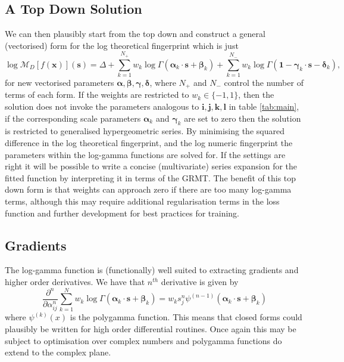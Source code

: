 \documentclass{article}
\begin{document}
\subsection{A Top Down Solution}
We can then plausibly start from the top down and construct a general (vectorised) form for the log theoretical fingerprint which is just 
\begin{equation}
\log \mathcal{M}_D[f(\mathbf{x})](\mathbf{s}) = \Delta + \sum_{k=1}^{N_+} w_k \log \Gamma( \boldsymbol\alpha_k \cdot \mathbf{s} + \boldsymbol\beta_k) + \sum_{k=1}^{N_-} w_k \log \Gamma(\mathbf{1} - \boldsymbol\gamma_k \cdot \mathbf{s} - \boldsymbol\delta_k),
\end{equation}
for new vectorised parameters $\boldsymbol\alpha, \boldsymbol\beta, \boldsymbol\gamma, \boldsymbol\delta$, where $N_+$ and $N_-$ control the number of terms of each form. If the weights are restricted to $w_k \in \{-1,1\}$, then the solution does not invoke the parameters analogous to $\mathbf{i,j,k,l}$ in table \ref{tab:main}, if the corresponding scale parameters $\boldsymbol \alpha_k$ and $\boldsymbol\gamma_k$ are set to zero then the solution is restricted to generalised hypergeometric series. By minimising the squared difference in the log theoretical fingerprint, and the log numeric fingerprint the parameters within the log-gamma functions are solved for. If the settings are right it will be possible to write a concise (multivariate) series expansion for the fitted function by interpreting it in terms of the GRMT. The benefit of this top down form is that weights can approach zero if there are too many log-gamma terms, although this may require additional regularisation terms in the loss function and further development for best practices for training.

\subsection{Gradients}
The log-gamma function is (functionally) well suited to extracting gradients and higher order derivatives. We have that $n^{th}$ derivative is given by
$$
\frac{\partial^n}{\partial \alpha_{ij}^n} \sum_{k=1}^{N} w_k \log \Gamma( \boldsymbol\alpha_k \cdot \mathbf{s} + \boldsymbol\beta_k) = w_k s_j^n \psi^{(n-1)}( \boldsymbol\alpha_k \cdot \mathbf{s} + \boldsymbol\beta_k)
$$
where $\psi^{(k)}(x)$ is the polygamma function. This means that closed forms could plausibly be written for high order differential routines. Once again this may be subject to optimisation over complex numbers and polygamma functions do extend to the complex plane.
\end{document}
